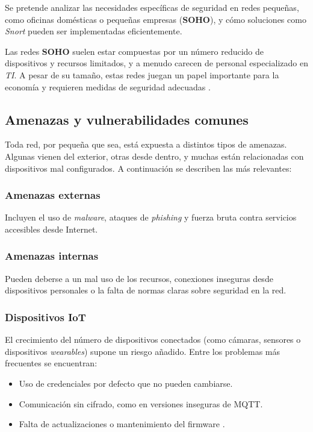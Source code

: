\documentclass[11pt,a4paper,twoside]{report}
\begin{document}
Se pretende analizar las necesidades específicas de seguridad en redes pequeñas, como oficinas domésticas o pequeñas empresas (\textbf{SOHO}), y cómo soluciones como \textit{Snort} pueden ser implementadas eficientemente.\newline

Las redes \textbf{SOHO} suelen estar compuestas por un número reducido de dispositivos y recursos limitados, y a menudo carecen de personal especializado en \textit{TI}. A pesar de su tamaño, estas redes juegan un papel importante para la economía y requieren medidas de seguridad adecuadas \cite{ruedarevisiting}.

\subsection{Amenazas y vulnerabilidades comunes}

Toda red, por pequeña que sea, está expuesta a distintos tipos de amenazas. Algunas vienen del exterior, otras desde dentro, y muchas están relacionadas con dispositivos mal configurados. A continuación se describen las más relevantes:

\subsubsection{Amenazas externas}

Incluyen el uso de \textit{malware}, ataques de \textit{phishing} y fuerza bruta contra servicios accesibles desde Internet.

\subsubsection{Amenazas internas}

Pueden deberse a un mal uso de los recursos, conexiones inseguras desde dispositivos personales o la falta de normas claras sobre seguridad en la red.

\subsubsection{Dispositivos IoT}

El crecimiento del número de dispositivos conectados (como cámaras, sensores o dispositivos \textit{wearables}) supone un riesgo añadido. Entre los problemas más frecuentes se encuentran:

\begin{itemize}
	\item Uso de credenciales por defecto que no pueden cambiarse.
	\item Comunicación sin cifrado, como en versiones inseguras de MQTT.
	\item Falta de actualizaciones o mantenimiento del firmware \cite{bakhshi2024review}.
\end{itemize}
\end{document}
